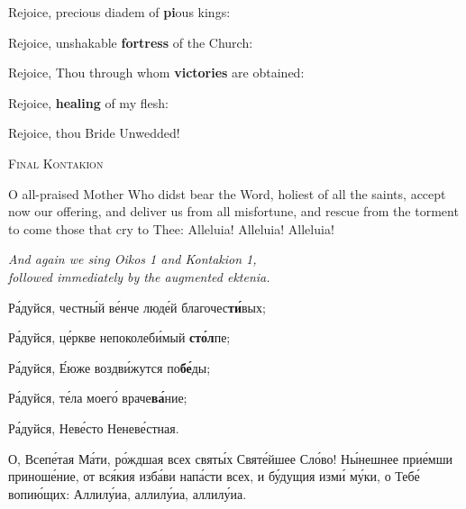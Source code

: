 \pagebreak



Rejoice, precious diadem of \textbf{pi}ous kings:


Rejoice, unshakable \textbf{fortress} of the Church:


Rejoice, Thou through whom \textbf{victories} are obtained:


Rejoice, \textbf{healing} of my flesh:


Rejoice, thou Bride Unwedded!

\begin{center}
  {\textsc{\color{Maroon}Final Kontakion}}
\end{center}

\Priest O all-praised Mother Who didst bear the Word, holiest of all the saints, accept now our offering, and deliver us from all misfortune, and rescue from the torment to come those that cry to Thee: Alleluia! Alleluia! Alleluia! \Thrice

\begin{center}
  {\color{Maroon}\emph{And again we sing Oikos 1 and Kontakion 1,\\followed immediately by the augmented ektenia.}}
\end{center}

\pagebreak

\begin{russian}

  Ра́дуйся, честны́й ве́нче люде́й благочес\textbf{ти́}вых;


  Ра́дуйся, це́ркве непоколеби́мый \textbf{сто́л}пе;


  Ра́дуйся, Е́юже воздви́жутся по\textbf{бе́}ды;


  Ра́дуйся, те́ла моего́ враче\textbf{ва́}ние;


  Ра́дуйся, Неве́сто Неневе́стная.


  О, Всепе́тая Ма́ти, ро́ждшая всех святы́х Святе́йшее Сло́во! Ны́нешнее прие́мши приноше́ние, от вся́кия изба́ви напа́сти всех, и бу́дущия изми́ му́ки, о Тебе́ вопию́щих: Аллилу́иа, аллилу́иа, аллилу́иа. \Trizhdy

\end{russian}

